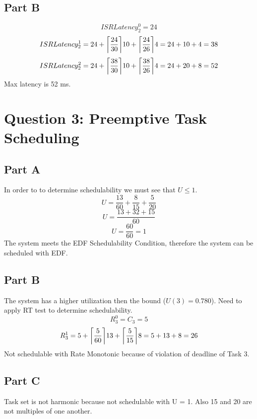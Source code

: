 \documentclass{article}
\DeclarePairedDelimiter\ceil{\lceil}{\rceil}
\begin{document}
	\subsection*{Part B}
	$$ ISRLatency_2^0 = 24 $$
	$$ ISRLatency_2^1 = 24 + \ceil*{\frac{24}{30}}10+\ceil*{\frac{24}{26}}4=24+10+4=38$$
	$$ ISRLatency_2^2 = 24 + \ceil*{\frac{38}{30}}10+\ceil*{\frac{38}{26}}4=24+20+8=52$$
	Max latency is 52 ms.
	\section*{Question 3: Preemptive Task Scheduling}
	\subsection*{Part A}
	In order to to determine schedulability we must see that $ U \leq 1 $.
	$$ U = \frac{13}{60} + \frac{8}{15}+\frac{5}{20}$$
	$$ U = \frac{13+32+15}{60}$$
	$$ U = \frac{60}{60} = 1$$
	The system meets the EDF Schedulability Condition, therefore the system can be scheduled with EDF.
	\subsection*{Part B}
	The system has a higher utilization then the bound ($U(3) = 0.780$). Need to apply RT test to determine schedulability.
	$$R_3^0=C_3=5$$
	$$R_3^1=5+\ceil*{\frac{5}{60}}13+\ceil*{\frac{5}{15}}8=5+13+8=26$$
	Not schedulable with Rate Monotonic because of violation of deadline of Task 3.
	\subsection*{Part C}
	Task set is not harmonic because not schedulable with U = 1. Also 15 and 20 are not multiples of one another.
\end{document}
